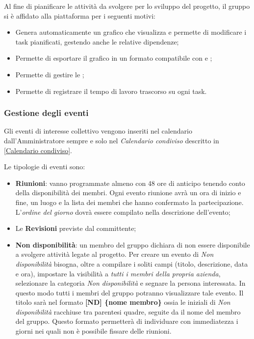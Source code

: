 		Al fine di pianificare le attività da svolgere per lo sviluppo del progetto, il gruppo si è affidato alla piattaforma  per i seguenti motivi:
		\begin{itemize}
			\item Genera automaticamente un grafico  che visualizza e permette di modificare i task pianificati, gestendo anche le relative dipendenze;
			\item Permette di esportare il grafico  in un formato compatibile con  e ;
			\item Permette di gestire le ;
			\item Permette di registrare il tempo di lavoro trascorso su ogni task.
		\end{itemize}

		\subsubsection{Gestione degli eventi}
		
		Gli eventi di interesse collettivo vengono inseriti nel calendario dall'Amministratore sempre e solo nel \emph{Calendario condiviso} descritto in \ref{Calendario condiviso}.
		
		Le tipologie di eventi sono:
		\begin{itemize}
	  		\item \textbf{Riunioni}: vanno programmate almeno con 48 ore di anticipo tenendo conto della disponibilità dei membri. Ogni evento riunione avrà un ora di inizio e fine, un luogo e la lista dei membri che hanno confermato la partecipazione. L'\emph{ordine del giorno} dovrà essere compilato nella descrizione dell'evento;
	  		\item Le \textbf{Revisioni} previste dal committente;
	  		\item \textbf{Non disponibilità}: un membro del gruppo dichiara di non essere disponibile a svolgere attività legate al progetto. Per creare un evento di \emph{Non disponibilità} bisogna, oltre a compilare i soliti campi (titolo, descrizione, data e ora), impostare la visibilità a \emph{tutti i membri della propria azienda}, selezionare la categoria \emph{Non disponibilità} e segnare la persona interessata. In questo modo tutti i membri del gruppo \GroupName{} potranno visualizzare tale evento. 
	  		Il titolo sarà nel formato \textbf{[ND] \{nome membro\}\/} ossia le iniziali di \emph{Non disponibilità} racchiuse tra parentesi quadre, seguite da il nome del membro del gruppo. Questo formato permetterà di individuare con immediatezza i giorni nei quali non è possibile fissare delle riunioni.
		\end{itemize}
	
